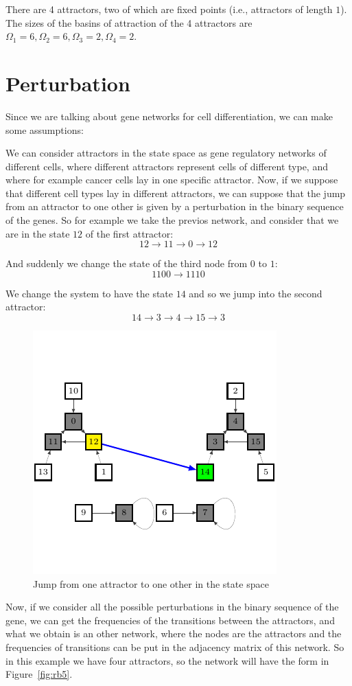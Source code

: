 \documentclass[11pt]{article}
\begin{document}
There are 4 attractors, two of which are fixed points
(i.e., attractors of length $1$). The sizes of the basins of
attraction of the 4 attractors are $\Omega_1=6,\Omega_2= 6,\Omega_3 = 2,\Omega_4 = 2$.

\section{Perturbation}
Since we are talking about gene networks for cell differentiation, we can make some assumptions:

We can consider attractors in the state space as gene regulatory networks of different cells, where different attractors represent cells of different type, and where for example cancer cells lay in one specific attractor.
Now, if we suppose that different cell types lay in different attractors, we can suppose that the jump from an attractor to one other is given by a perturbation in the binary sequence of the genes.
So for example we take the previos network, and consider that we are in the state $12$ of the first attractor:
$$
12 \to 11 \to 0 \to 12
$$

And suddenly we change the state of the third node from $0$ to $1$:
$$
1100 \to 1110
$$

We change the system to have the state $14$ and so we jump into the second attractor:
$$
14 \to 3 \to 4 \to 15 \to 3
$$
\begin{figure}[h]
\centering
\includegraphics[scale=0.8]{fg4.pdf}
\caption{Jump from one attractor to one other in the state space}
\label{fig:rb4}
\end{figure}


Now, if we consider all the possible perturbations in the binary sequence of the gene, we can get the frequencies of the transitions between the attractors, and what we obtain is an other network, where the nodes are the attractors and the frequencies of transitions can be put in the adjacency matrix of this network.
So in this example we have four attractors, so the network will have the form in Figure~\ref{fig:rb5}.
\end{document}
